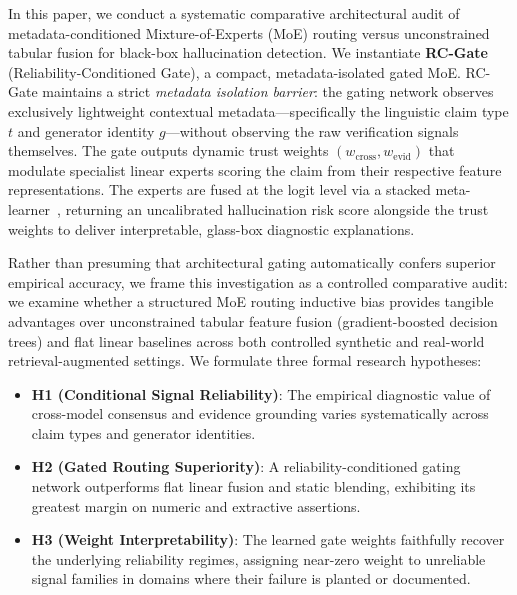 \documentclass[pdflatex,sn-mathphys,Numbered]{sn-jnl}
\begin{document}
In this paper, we conduct a systematic comparative architectural audit of metadata-conditioned Mixture-of-Experts (MoE) routing versus unconstrained tabular fusion for black-box hallucination detection. We instantiate \textbf{RC-Gate} (Reliability-Conditioned Gate), a compact, metadata-isolated gated MoE. RC-Gate maintains a strict \emph{metadata isolation barrier}: the gating network observes exclusively lightweight contextual metadata—specifically the linguistic claim type $t$ and generator identity $g$—without observing the raw verification signals themselves. The gate outputs dynamic trust weights $(w_{\mathrm{cross}}, w_{\mathrm{evid}})$ that modulate specialist linear experts scoring the claim from their respective feature representations. The experts are fused at the logit level via a stacked meta-learner~\cite{wolpert1992stacked}, returning an uncalibrated hallucination risk score alongside the trust weights to deliver interpretable, glass-box diagnostic explanations.

Rather than presuming that architectural gating automatically confers superior empirical accuracy, we frame this investigation as a controlled comparative audit: we examine whether a structured MoE routing inductive bias provides tangible advantages over unconstrained tabular feature fusion (gradient-boosted decision trees) and flat linear baselines across both controlled synthetic and real-world retrieval-augmented settings. We formulate three formal research hypotheses:
\begin{itemize}
    \item \textbf{H1 (Conditional Signal Reliability)}: The empirical diagnostic value of cross-model consensus and evidence grounding varies systematically across claim types and generator identities.
    \item \textbf{H2 (Gated Routing Superiority)}: A reliability-conditioned gating network outperforms flat linear fusion and static blending, exhibiting its greatest margin on numeric and extractive assertions.
    \item \textbf{H3 (Weight Interpretability)}: The learned gate weights faithfully recover the underlying reliability regimes, assigning near-zero weight to unreliable signal families in domains where their failure is planted or documented.
\end{itemize}
\end{document}

